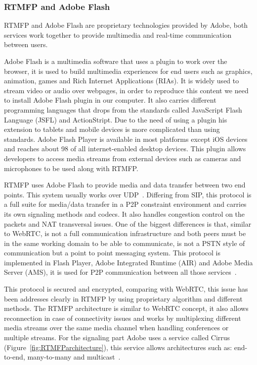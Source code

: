 \subsubsection{RTMFP and Adobe Flash}

RTMFP and Adobe Flash are proprietary technologies provided by Adobe, both services work together to provide multimedia and real-time communication between users.

Adobe Flash is a multimedia software that uses a plugin to work over the browser, it is used to build multimedia experiences for end users such as graphics, animation, games and Rich Internet Applications (RIAs). It is widely used to stream video or audio over webpages, in order to reproduce this content we need to install Adobe Flash plugin in our computer. It also carries different programming languages that drops from the standards called JavaScript Flash Language (JSFL) and ActionStript. Due to the need of using a plugin his extension to tablets and mobile devices is more complicated than using standards. Adobe Flash Player is available in most platforms except iOS devices and reaches about 98 of all internet-enabled desktop devices. This plugin allows developers to access media streams from external devices such as cameras and microphones to be used along with RTMFP.

RTMFP uses Adobe Flash to provide media and data transfer between two end points. This system usually works over UDP~\cite{rtmfpDraft}. Differing from SIP, this protocol is a full suite for media/data transfer in a P2P constraint environment and carries its own signaling methods and codecs. It also handles congestion control on the packets and NAT transversal issues. One of the biggest differences is that, similar to WebRTC, is not a full communication infrastructure and both peers must be in the same working domain to be able to communicate, is not a PSTN style of communication but a point to point messaging system. This protocol is implemented in Flash Player, Adobe Integrated Runtime (AIR) and Adobe Media Server (AMS), it is used for P2P communication between all those services~\cite{rtmfpDraft}. 

This protocol is secured and encrypted, comparing with WebRTC, this issue has been addresses clearly in RTMFP by using proprietary algorithm and different methods. The RTMFP architecture is similar to WebRTC concept, it also allows reconnection in case of connectivity issues and works by multiplexing different media streams over the same media channel when handling conferences or multiple streams. For the signaling part Adobe uses a service called Cirrus (Figure~\ref{fig:RTMFParchitecture}), this service allows architectures such as: end-to-end, many-to-many and multicast~\cite{cirrusFAQ}.
 
